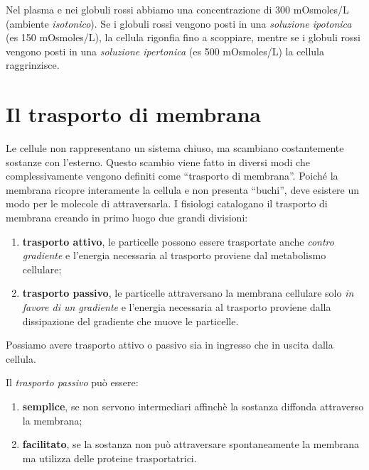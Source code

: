 \documentclass[]{article}
\begin{document}
Nel plasma e nei globuli rossi abbiamo una concentrazione di 300
mOsmoles/L (ambiente \emph{isotonico}). Se i globuli rossi vengono posti
in una \emph{soluzione ipotonica} (es 150 mOsmoles/L), la cellula
rigonfia fino a scoppiare, mentre se i globuli rossi vengono posti in
una \emph{soluzione ipertonica} (es 500 mOsmoles/L) la cellula
raggrinzisce.

\section{Il trasporto di membrana}\label{il-trasporto-di-membrana}

Le cellule non rappresentano un sistema chiuso, ma scambiano
costantemente sostanze con l'esterno. Questo scambio viene fatto in
diversi modi che complessivamente vengono definiti come ``trasporto di
membrana''. Poiché la membrana ricopre interamente la cellula e non
presenta ``buchi'', deve esistere un modo per le molecole di
attraversarla. I fisiologi catalogano il trasporto di membrana creando
in primo luogo due grandi divisioni:

\begin{enumerate}
\def\labelenumi{\arabic{enumi}.}
\itemsep1pt\parskip0pt
\item
  \textbf{trasporto attivo}, le particelle possono essere trasportate
  anche \emph{contro gradiente} e l'energia necessaria al trasporto
  proviene dal metabolismo cellulare;
\item
  \textbf{trasporto passivo}, le particelle attraversano la membrana
  cellulare solo \emph{in favore di un gradiente} e l'energia necessaria
  al trasporto proviene dalla dissipazione del gradiente che muove le
  particelle.
\end{enumerate}

Possiamo avere trasporto attivo o passivo sia in ingresso che in uscita
dalla cellula.

Il \emph{trasporto passivo} può essere:

\begin{enumerate}
\def\labelenumi{\arabic{enumi}.}
\itemsep1pt\parskip0pt
\item
  \textbf{semplice}, se non servono intermediari affinchè la sostanza
  diffonda attraverso la membrana;
\item
  \textbf{facilitato}, se la sostanza non può attraversare
  spontaneamente la membrana ma utilizza delle proteine trasportatrici.
\end{enumerate}
\end{document}
